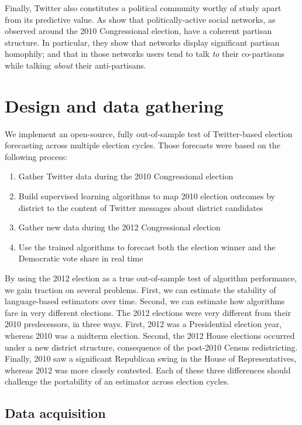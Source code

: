 \documentclass[11pt]{article}
\begin{document}
Finally, Twitter also constitutes a political community worthy of
study apart from its predictive value. As \cite{conover2011} show that
politically-active social networks, as observed around the 2010
Congressional election, have a coherent partisan structure. In
particular, they show that networks display significant partisan
homophily; and that in those networks users tend to talk \textit{to}
their co-partisans while talking \textit{about} their anti-partisans.


\section{Design and data gathering}
\label{sec:design-data-gath}

We implement an open-source, fully out-of-sample test of Twitter-based
election forecasting across multiple election cycles. Those forecasts were based on
the following process:

\begin{enumerate}
\item Gather Twitter data during the 2010 Congressional election
\item Build supervised learning algorithms to map 2010 election
  outcomes by district to the content of Twitter messages about
  district candidates
\item Gather new data during the 2012 Congressional election
\item Use the trained algorithms to forecast both the election winner
  and the Democratic vote share in real time
\end{enumerate}

By using the 2012 election as a true out-of-sample test of algorithm
performance, we gain traction on several problems. First, we can
estimate the stability of language-based estimators over time. Second,
we can estimate how algorithms fare in very different elections. The
2012 elections were very different from their 2010 predecessors, in
three ways. First, 2012 was a Presidential election year, whereas 2010
was a midterm election. Second, the 2012 House elections occurred
under a new district structure, consequence of the post-2010 Census
redistricting. Finally, 2010 saw a significant Republican swing in the
House of Representatives, whereas 2012 was more closely
contested. Each of these three differences should challenge the
portability of an estimator across election cycles. 

\subsection{Data acquisition}
\label{sec:data-acquisition}
\end{document}
